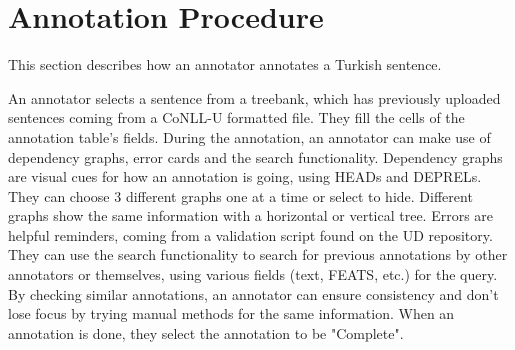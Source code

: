 \section{Annotation Procedure}
\label{sec:annotation}
This section describes how an annotator annotates a Turkish sentence.

An annotator selects a sentence from a treebank, which has previously uploaded sentences coming from a CoNLL-U formatted file.
They fill the cells of the annotation table's fields.
During the annotation, an annotator can make use of dependency graphs, error cards and the search functionality.
Dependency graphs are visual cues for how an annotation is going, using HEADs and DEPRELs.
They can choose 3 different graphs one at a time or select to hide.
Different graphs show the same information with a horizontal or vertical tree.
Errors are helpful reminders, coming from a validation script found on the UD repository.
They can use the search functionality to search for previous annotations by other annotators or themselves, using various fields (text, FEATS, etc.) for the query.
By checking similar annotations, an annotator can ensure consistency and don't lose focus by trying manual methods for the same information.
When an annotation is done, they select the annotation to be "Complete".


